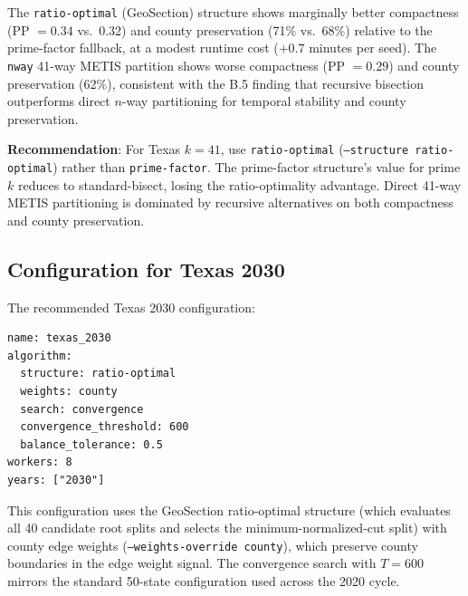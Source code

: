 The \texttt{ratio-optimal} (GeoSection) structure shows marginally better compactness
(PP $= 0.34$ vs.\ 0.32) and county preservation (71\% vs.\ 68\%) relative to the
prime-factor fallback, at a modest runtime cost ($+0.7$ minutes per seed). The
\texttt{nway} 41-way METIS partition shows worse compactness (PP $= 0.29$) and county
preservation (62\%), consistent with the B.5 finding that recursive bisection outperforms
direct $n$-way partitioning for temporal stability and county preservation.

\textbf{Recommendation}: For Texas $k=41$, use \texttt{ratio-optimal} (\texttt{--structure ratio-optimal})
rather than \texttt{prime-factor}. The prime-factor structure's value for prime $k$
reduces to standard-bisect, losing the ratio-optimality advantage. Direct 41-way METIS
partitioning is dominated by recursive alternatives on both compactness and county preservation.

\subsection{Configuration for Texas 2030}

The recommended Texas 2030 configuration:

\begin{verbatim}
name: texas_2030
algorithm:
  structure: ratio-optimal
  weights: county
  search: convergence
  convergence_threshold: 600
  balance_tolerance: 0.5
workers: 8
years: ["2030"]
\end{verbatim}

This configuration uses the GeoSection ratio-optimal structure (which evaluates
all 40 candidate root splits and selects the minimum-normalized-cut split) with
county edge weights (\texttt{--weights-override county}), which preserve county
boundaries in the edge weight signal. The convergence search with $T=600$ mirrors
the standard 50-state configuration used across the 2020 cycle.
